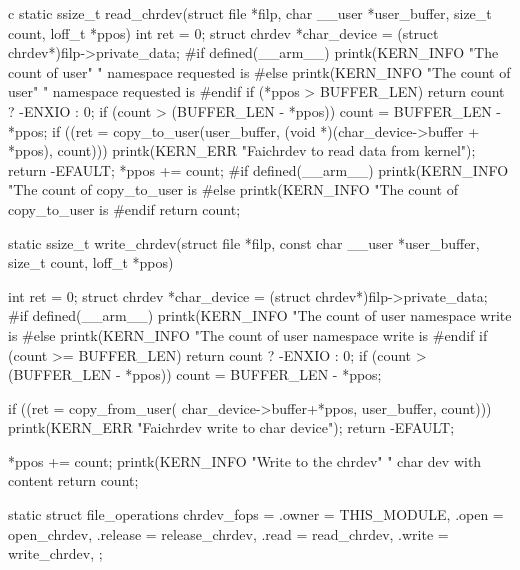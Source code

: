 \begin{code-block}{c}
static ssize_t read_chrdev(struct file *filp,
        char __user *user_buffer, size_t count, loff_t *ppos)
{
        int ret = 0;
        struct chrdev *char_device = (struct chrdev*)filp->private_data;
#if defined(__arm__)
        printk(KERN_INFO "The count of user"
                " namespace requested is %
#else
        printk(KERN_INFO "The count of user"
                " namespace requested is %
#endif
        if (*ppos > BUFFER_LEN) {
                return count ? -ENXIO : 0;
        }
        if (count > (BUFFER_LEN - *ppos)) {
                count = BUFFER_LEN - *ppos;
        }
        if ((ret = copy_to_user(user_buffer,
                (void *)(char_device->buffer + *ppos), count))) {
                printk(KERN_ERR "Faichrdev to read data from kernel\n");
                return -EFAULT;
        }
        *ppos += count;
#if defined(__arm__)
        printk(KERN_INFO "The count of copy_to_user is %
#else
        printk(KERN_INFO "The count of copy_to_user is %
#endif
        return count;
}

static ssize_t write_chrdev(struct file *filp,
        const char __user *user_buffer, size_t count, loff_t *ppos)
{
        int ret = 0;
        struct chrdev *char_device = (struct chrdev*)filp->private_data;
#if defined(__arm__)
        printk(KERN_INFO
                "The count of user namespace write is %
#else
        printk(KERN_INFO
                "The count of user namespace write is %
#endif
        if (count >= BUFFER_LEN) {
                return count ? -ENXIO : 0;
        }
        if (count > (BUFFER_LEN - *ppos)) {
                count = BUFFER_LEN - *ppos;
        }

        if ((ret = copy_from_user(
                char_device->buffer+*ppos, user_buffer, count))) {
                printk(KERN_ERR "Faichrdev write to char device\n");
                return -EFAULT;
        }

        *ppos += count;
        printk(KERN_INFO "Write to the chrdev"
                " char dev with content %
        return count;
}

static struct file_operations chrdev_fops = {
        .owner   = THIS_MODULE,
        .open    = open_chrdev,
        .release = release_chrdev,
        .read    = read_chrdev,
        .write   = write_chrdev,
};


\end{code-block}
